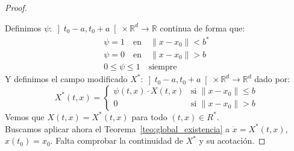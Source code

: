 \begin{prop}
\begin{proof}
\begin{figure}[H]
        \end{figure}
        \noindent
        Definimos $\psi:\left]t_0-a,t_0+a\right[\times \mathbb{R}^d\to \mathbb{R}$ continua de forma que:
        \begin{gather*}
            \psi = 1 \quad \text{en}\quad \|x-x_0\| < b^\ast \\
            \psi = 0 \quad \text{en}\quad \|x-x_0\| > b \\
            0\leq \psi \leq 1 \quad \text{siempre}
        \end{gather*}
        Y definimos el campo modificado $X^\ast:\left]t_0-a,t_0+a\right[\times \mathbb{R}^d\to \mathbb{R}^d$ dado por:
        \begin{equation*}
            X^\ast(t,x) = \left\{\begin{array}{ll}
                \psi(t,x)\cdot X(t,x) & \text{si\ }\|x-x_0\|\leq b  \\
                 0 & \text{si\ } \|x-x_0\| > b
            \end{array}\right. 
        \end{equation*}
        Vemos que $X(t,x) = X^\ast(t,x)$ para todo $(t,x)\in R^\ast$.\\

        \noindent
        Buscamos aplicar ahora el Teorema~\ref{teo:global_existencia} a $\dot{x} = X^\ast(t,x)$, $x(t_0) = x_0$. Falta comprobar la continuidad de $X^\ast$ y su acotación.


\end{proof}
\end{prop}
